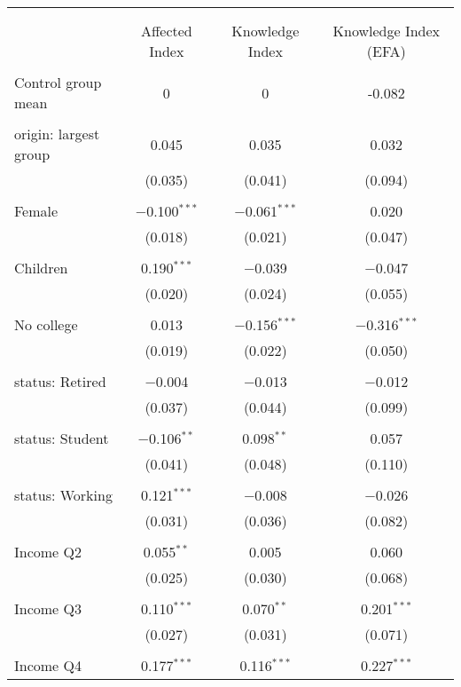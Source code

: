 
\begin{tabular}{@{\extracolsep{5pt}}lccc} 
\\[-1.8ex]\hline 
\hline \\[-1.8ex] 
\\[-1.8ex] & Affected Index & Knowledge Index & Knowledge Index (EFA) \\ 
\hline \\[-1.8ex] 
 Control group mean & 0 & 0 & -0.082  \\ \hline \\[-1.8ex] origin: largest group & 0.045 & 0.035 & 0.032 \\ 
  & (0.035) & (0.041) & (0.094) \\ 
  & & & \\ 
 Female & $-$0.100$^{***}$ & $-$0.061$^{***}$ & 0.020 \\ 
  & (0.018) & (0.021) & (0.047) \\ 
  & & & \\ 
 Children & 0.190$^{***}$ & $-$0.039 & $-$0.047 \\ 
  & (0.020) & (0.024) & (0.055) \\ 
  & & & \\ 
 No college & 0.013 & $-$0.156$^{***}$ & $-$0.316$^{***}$ \\ 
  & (0.019) & (0.022) & (0.050) \\ 
  & & & \\ 
 status: Retired & $-$0.004 & $-$0.013 & $-$0.012 \\ 
  & (0.037) & (0.044) & (0.099) \\ 
  & & & \\ 
 status: Student & $-$0.106$^{**}$ & 0.098$^{**}$ & 0.057 \\ 
  & (0.041) & (0.048) & (0.110) \\ 
  & & & \\ 
 status: Working & 0.121$^{***}$ & $-$0.008 & $-$0.026 \\ 
  & (0.031) & (0.036) & (0.082) \\ 
  & & & \\ 
 Income Q2 & 0.055$^{**}$ & 0.005 & 0.060 \\ 
  & (0.025) & (0.030) & (0.068) \\ 
  & & & \\ 
 Income Q3 & 0.110$^{***}$ & 0.070$^{**}$ & 0.201$^{***}$ \\ 
  & (0.027) & (0.031) & (0.071) \\ 
  & & & \\ 
 Income Q4 & 0.177$^{***}$ & 0.116$^{***}$ & 0.227$^{***}$ \\ 

\end{tabular}
